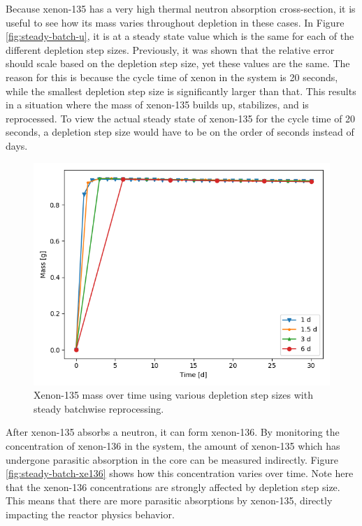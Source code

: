 {Because xenon-135 has a very high thermal neutron absorption cross-section, it is useful to see how its mass varies throughout depletion in these cases.
In Figure \ref{fig:steady-batch-u}, it is at a steady state value which is the same for each of the different depletion step sizes.
Previously, it was shown that the relative error should scale based on the depletion step size, yet these values are the same. The reason for this is because the cycle time of xenon in the system is 20 seconds, while the smallest depletion step size is significantly larger than that. This results in a situation where the mass of xenon-135 builds up, stabilizes, and is reprocessed. To view the actual steady state of xenon-135 for the cycle time of 20 seconds, a depletion step size would have to be on the order of seconds instead of days.

\begin{figure}[H]
  \centering
  \includegraphics[scale=0.7]{images/Xe135_sp_comp.png}
  \caption{Xenon-135 mass over time using various depletion step sizes with steady batchwise reprocessing.}
   \label{fig:steady-batch-xe135}
\end{figure}

After xenon-135 absorbs a neutron, it can form xenon-136.
By monitoring the concentration of xenon-136 in the system, the amount of xenon-135 which has undergone parasitic absorption in the core can be measured indirectly.
Figure \ref{fig:steady-batch-xe136} shows how this concentration varies over time.
Note here that the xenon-136 concentrations are strongly affected by depletion step size.
This means that there are more parasitic absorptions by xenon-135, directly impacting the reactor physics behavior.

}
